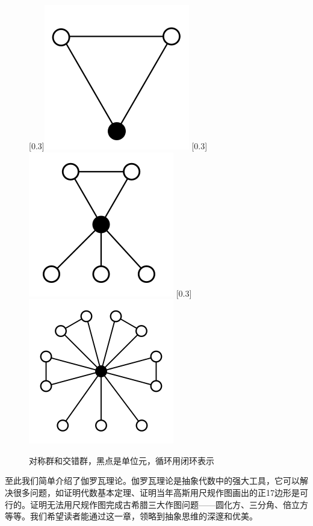 \documentclass[b5paper]{ctexart}
\begin{document}
\begin{figure}[htbp]
  \centering
  [0.3\linewidth]{\includegraphics[scale=0.25]{img/C3.png}} \quad
  [0.3\linewidth]{\includegraphics[scale=0.25]{img/S3.png}}
  [0.3\linewidth]{\includegraphics[scale=0.25]{img/A4.png}}
  \caption{对称群和交错群，黑点是单位元，循环用闭环表示}
  \label{fig:group-graph}
\end{figure}

至此我们简单介绍了伽罗瓦理论。伽罗瓦理论是抽象代数中的强大工具，它可以解决很多问题，如证明代数基本定理、证明当年高斯用尺规作图画出的正17边形是可行的。证明无法用尺规作图完成古希腊三大作图问题——圆化方、三分角、倍立方等等。我们希望读者能通过这一章，领略到抽象思维的深邃和优美。
\end{document}
